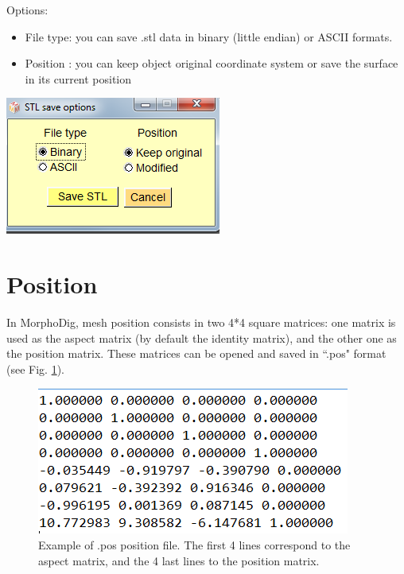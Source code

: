\begin{minipage}{0.5\textwidth}
Options:
\begin{itemize}
\item File type: you can save .stl data in binary (little endian) or
ASCII formats.

\item Position : you can keep object original coordinate system or save the surface in its current position
\end{itemize}

\end{minipage}    
\begin{minipage}{0.5\textwidth}\centering
  \includegraphics[scale=0.5]{images/File/Save_stl.png}
 \end{minipage} 







\section{Position}
In MorphoDig, mesh position consists in two
4*4 square matrices: one matrix is used as the
aspect matrix (by default the identity matrix),
and the other one as the position matrix. These
matrices can be opened and saved in ``.pos"
format (see Fig. \ref{position_file}).


\begin{figure}
  \centering
  \includegraphics[scale=0.5]{images/File/Position_file.png}
 \caption{Example of .pos position file. The first 4 lines correspond
to the aspect matrix, and the 4 last lines to the position matrix.}
\label{position_file}
\end{figure}
 



